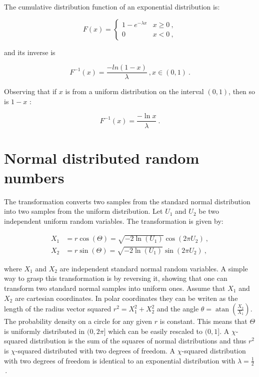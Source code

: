 \documentclass[a4paper]{scrartcl}
\begin{document}
The cumulative distribution function of an exponential distribution is:

\begin{equation*}
F(x) = \begin{cases} 1 - e^{-\lambda x} & x \geq 0~, \\ 0 & x < 0 ~,\end{cases}
\end{equation*}

and its inverse is

\begin{equation*}
F^{-1}(x) = \frac{-ln(1 - x)}{\lambda}~,x \in (0, 1)~.
\end{equation*}

Observing that if $x$ is from a uniform distribution on the interval $(0, 1)$, then so is $1 - x$ \citep{Devroye1986, Knuth1997b, Press2007}: 

\begin{equation*}
F^{-1}(x) = \frac{-\ln x}{\lambda}~.
\end{equation*}

\section*{Normal distributed random numbers}
The \citet{Box1958} transformation converts two samples from the standard normal distribution into two samples from the uniform distribution. Let $U_1$ and $U_2$ be two independent uniform random variables. The transformation is given by:

\begin{align*}
X_1 & =  r \cos(\Theta)  =  \sqrt{-2 \ln(U_1)} \cos(2 \pi U_2)~, \\
X_2 & =  r \sin(\Theta)  =  \sqrt{-2 \ln(U_1)} \sin(2 \pi U_2)~,
\end{align*}

where $X_1$ and $X_2$ are independent standard normal random variables. A simple way to grasp this transformation is by reversing it, showing that one can transform two standard normal samples into uniform ones. Assume that $X_1$ and $X_2$ are cartesian coordinates. In polar coordinates they can be writen as the length of the radius vector squared $r^2 = X_1^2 + X_2^2$ and the angle $\theta = \operatorname{atan}(\frac{X_2}{X_1})$.  The probability density on a circle for any given $r$ is constant. This means that $\Theta$ is uniformly distributed in $(0, 2 \pi]$ which can be easily rescaled to $(0, 1]$. A $\chi$-squared distribution is the sum of the squares of normal distributions and thus $r^2$ is $\chi$-squared distributed with two degrees of freedom. A $\chi$-squared distribution with two degrees of freedom is identical to an exponential distribution with $\lambda = \frac{1}{2}$\,\citep{Bronstein1997}.
   
\end{document}
